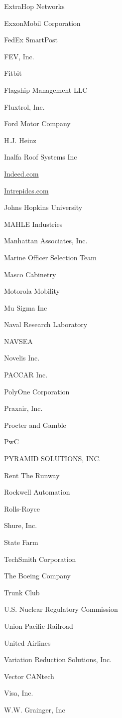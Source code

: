 \documentclass[twoside]{article}
\begin{document}
\begin{center}
\begin{multicols}{5}
\begin{FlushLeft}
\begin{compactitem}
\item ExtraHop Networks
\item ExxonMobil Corporation
\item FedEx SmartPost
\item FEV, Inc.
\item Fitbit
\item Flagship Management LLC
\item Fluxtrol, Inc.
\item Ford Motor Company
\item H.J. Heinz
\item Inalfa Roof Systems Inc
\item \url{Indeed.com}
\item \url{Intrepidcs.com}
\item Johns Hopkins University
\item MAHLE Industries
\item Manhattan Associates, Inc.
\item Marine Officer Selection Team
\item Masco Cabinetry
\item Motorola Mobility
\item Mu Sigma Inc
\item Naval Research Laboratory
\item NAVSEA
\item Novelis Inc.
\item PACCAR Inc.
\item PolyOne Corporation
\item Praxair, Inc.
\item Procter and Gamble
\item PwC
\item PYRAMID SOLUTIONS, INC.
\item Rent The Runway
\item Rockwell Automation
\item Rolls-Royce
\item Shure, Inc.
\item State Farm
\item TechSmith Corporation
\item The Boeing Company
\item Trunk Club
\item U.S. Nuclear Regulatory Commission
\item Union Pacific Railroad
\item United Airlines
\item Variation Reduction Solutions, Inc.
\item Vector CANtech
\item Visa, Inc.
\item W.W. Grainger, Inc
\end{compactitem}
        \end{FlushLeft}
        \vspace{1em}
        \end{multicols}\end{center}
\end{document}
